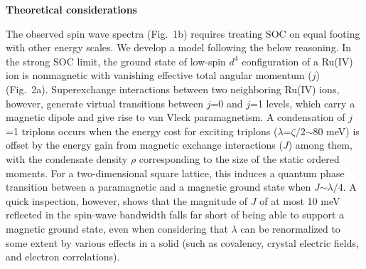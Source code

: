 \vspace{ 10 pt}
\noindent
{\bf Theoretical considerations}

\noindent
The observed spin wave spectra (Fig.~1b) requires treating SOC on equal footing with other energy scales. We develop a model following the below reasoning. In the strong SOC limit, the ground state of low-spin $d^4$ configuration of a Ru(IV) ion is nonmagnetic with vanishing effective total angular momentum ($j$) (Fig.~2a). Superexchange interactions between two neighboring Ru(IV) ions, however, generate virtual transitions between $j$=0 and $j$=1 levels, which carry a magnetic dipole and give rise to van Vleck paramagnetism. A condensation of $j$=1 triplons occurs when the energy cost for exciting triplons ($\lambda$=$\zeta/2$$\sim$80 meV) is offset by the energy gain from magnetic exchange interactions ($J$) among them, with the condensate density $\rho$ corresponding to the size of the static ordered moments. For a two-dimensional square lattice, this induces a quantum phase transition between a paramagnetic and a magnetic ground state when $J$$\sim$$\lambda/4$. A quick inspection, however, shows that the magnitude of $J$ of at most 10 meV reflected in the spin-wave bandwidth falls far short of being able to support a magnetic ground state, even when considering that $\lambda$ can be renormalized to some extent by various effects in a solid (such as covalency, crystal electric fields, and electron correlations). 
